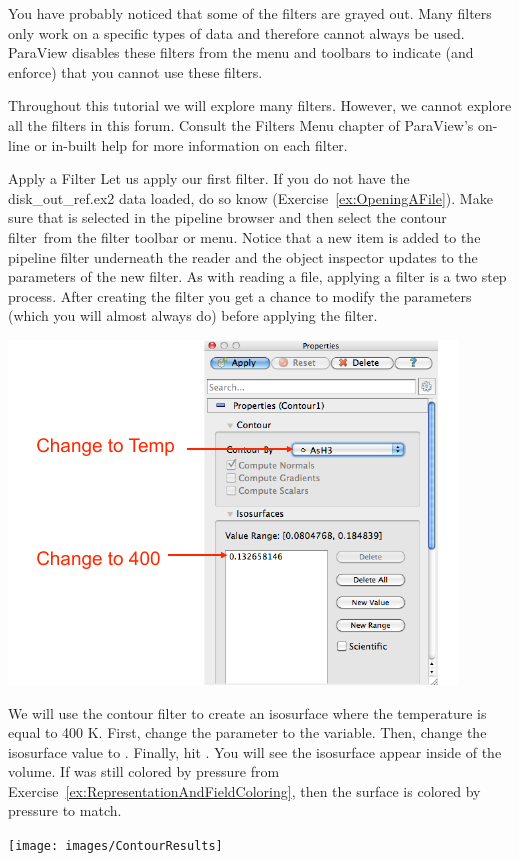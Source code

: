 You have probably noticed that some of the filters are grayed out.  Many
filters only work on a specific types of data and therefore cannot always
be used.  ParaView disables these filters from the menu and toolbars to
indicate (and enforce) that you cannot use these filters.

Throughout this tutorial we will explore many filters.  However, we cannot
explore all the filters in this forum.  Consult the Filters Menu
chapter of ParaView's on-line or in-built help for more information on each filter.

\begin{exercise}{Apply a Filter}
  \label{ex:ApplyAFilter}%
  Let us apply our first filter.  If you do not have the disk\_out\_ref.ex2
  data loaded, do so know (Exercise~\ref{ex:OpeningAFile}).  Make sure that
   is selected in the pipeline browser and then
  select the contour filter~\contour from the filter toolbar or
   menu.  Notice that a new item is added to the pipeline
  filter underneath the reader and the object inspector updates to the
  parameters of the new filter.  As with reading a file, applying a filter
  is a two step process.  After creating the filter you get a chance to
  modify the parameters (which you will almost always do) before applying
  the filter.


  \begin{inlinefig}
    \includegraphics[scale=\bbscale]{images/ContourOptions}
  \end{inlinefig}

  We will use the contour filter to create an isosurface where the
  temperature is equal to 400 K.  First, change the 
  parameter to the  variable.  Then, change the isosurface value
  to .  Finally, hit \apply.  You will see the isosurface appear
  inside of the volume.  If  was still colored by
  pressure from Exercise~\ref{ex:RepresentationAndFieldColoring}, then the
  surface is colored by pressure to match.

  \begin{inlinefig}
    \texttt{[image: images/ContourResults]}
  \end{inlinefig}

\end{exercise}

